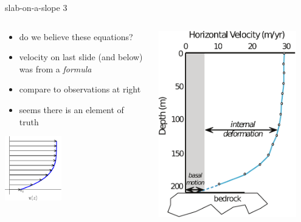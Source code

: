 \begin{frame}{slab-on-a-slope 3}

\begin{columns}
\begin{column}{0.6\textwidth}
\begin{itemize}
\item do we believe these equations?
\item velocity on last slide (and below) was from a \emph{formula}
\item compare to observations at right
\item seems there is an element of truth
\end{itemize}
\begin{center}
\includegraphics[width=0.4\textwidth]{photos/slabvel}
\end{center}
\end{column}
\begin{column}{0.4\textwidth}
\includegraphics[width=0.9\textwidth]{photos/athabasca_deform}


\end{column}
\end{columns}
\end{frame}
